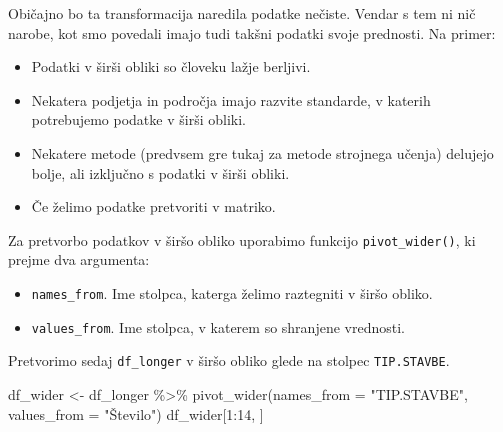 \documentclass[
]{book}
\newenvironment{Shaded}{\begin{snugshade}}{\end{snugshade}}
\newcommand{\AttributeTok}[1]{\textcolor[rgb]{0.77,0.63,0.00}{#1}}
\newcommand{\DecValTok}[1]{\textcolor[rgb]{0.00,0.00,0.81}{#1}}
\newcommand{\FunctionTok}[1]{\textcolor[rgb]{0.00,0.00,0.00}{#1}}
\newcommand{\NormalTok}[1]{#1}
\newcommand{\OtherTok}[1]{\textcolor[rgb]{0.56,0.35,0.01}{#1}}
\newcommand{\SpecialCharTok}[1]{\textcolor[rgb]{0.00,0.00,0.00}{#1}}
\newcommand{\StringTok}[1]{\textcolor[rgb]{0.31,0.60,0.02}{#1}}
\providecommand{\tightlist}{%
  \setlength{\itemsep}{0pt}\setlength{\parskip}{0pt}}
\begin{document}
Običajno bo ta transformacija naredila podatke nečiste. Vendar s tem ni nič narobe, kot smo povedali imajo tudi takšni podatki svoje prednosti. Na primer:

\begin{itemize}
\tightlist
\item
  Podatki v širši obliki so človeku lažje berljivi.
\item
  Nekatera podjetja in področja imajo razvite standarde, v katerih potrebujemo podatke v širši obliki.
\item
  Nekatere metode (predvsem gre tukaj za metode strojnega učenja) delujejo bolje, ali izključno s podatki v širši obliki.
\item
  Če želimo podatke pretvoriti v matriko.
\end{itemize}

Za pretvorbo podatkov v širšo obliko uporabimo funkcijo \texttt{pivot\_wider()}, ki prejme dva argumenta:

\begin{itemize}
\tightlist
\item
  \texttt{names\_from}. Ime stolpca, katerga želimo raztegniti v širšo obliko.
\item
  \texttt{values\_from}. Ime stolpca, v katerem so shranjene vrednosti.
\end{itemize}

Pretvorimo sedaj \texttt{df\_longer} v širšo obliko glede na stolpec \texttt{TIP.STAVBE}.

\begin{Shaded}
\begin{Highlighting}[]
\NormalTok{df\_wider }\OtherTok{\textless{}{-}}\NormalTok{ df\_longer }\SpecialCharTok{\%\textgreater{}\%}
  \FunctionTok{pivot\_wider}\NormalTok{(}\AttributeTok{names\_from =} \StringTok{"TIP.STAVBE"}\NormalTok{, }\AttributeTok{values\_from =} \StringTok{"Število"}\NormalTok{)}
\NormalTok{df\_wider[}\DecValTok{1}\SpecialCharTok{:}\DecValTok{14}\NormalTok{, ]}
\end{Highlighting}
\end{Shaded}
\end{document}
